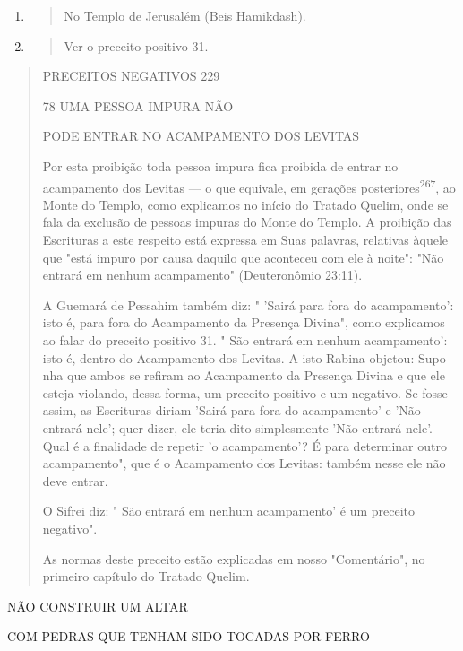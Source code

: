 \begin{enumerate}
\def\labelenumi{\arabic{enumi}.}
\setcounter{enumi}{264}
\item
  \begin{quote}
  No Templo de Jerusalém (Beis Hamikdash).
  \end{quote}
\item
  \begin{quote}
  Ver o preceito positivo 31.
  \end{quote}
\end{enumerate}

\begin{quote}
PRECEITOS NEGATIVOS 229

78 UMA PESSOA IMPURA NÃO

PODE ENTRAR NO ACAMPAMENTO DOS LEVITAS

Por esta proibição toda pessoa impura fica proibida de entrar no
acampamento dos Levitas --- o que equivale, em gerações
posteriores\textsuperscript{267}, ao Monte do Templo, como explicamos no
início do Tratado Quelim, onde se fa­la da exclusão de pessoas impuras
do Monte do Templo. A proibição das Escri­turas a este respeito está
expressa em Suas palavras, relativas àquele que "está impuro por causa
daquilo que aconteceu com ele à noite": "Não entrará em nenhum
acampamento" (Deuteronômio 23:11).

A Guemará de Pessahim também diz: " 'Sairá para fora do acampa­mento':
isto é, para fora do Acampamento da Presença Divina", como explica­mos
ao falar do preceito positivo 31. " São entrará em nenhum acampamen­to':
isto é, dentro do Acampamento dos Levitas. A isto Rabina objetou:
Supo­nha que ambos se refiram ao Acampamento da Presença Divina e que
ele esteja violando, dessa forma, um preceito positivo e um negativo. Se
fosse assim, as Escrituras diriam 'Sairá para fora do acampamento' e
'Não entrará nele'; quer dizer, ele teria dito simplesmente 'Não entrará
nele'. Qual é a finalidade de re­petir 'o acampamento'? É para
determinar outro acampamento", que é o Acam­pamento dos Levitas: também
nesse ele não deve entrar.

O Sifrei diz: " São entrará em nenhum acampamento' é um precei­to
negativo".

As normas deste preceito estão explicadas em nosso "Comentário", no
primeiro capítulo do Tratado Quelim.
\end{quote}

NÃO CONSTRUIR UM ALTAR

COM PEDRAS QUE TENHAM SIDO TOCADAS POR FERRO

